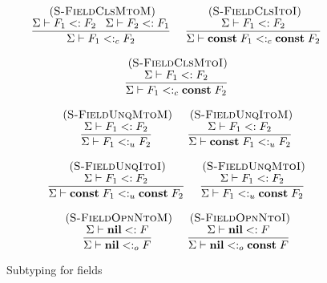 \documentclass[preprint]{sigplanconf}
\newcommand{\Nil}{\mathbf{nil}}
\newcommand{\Const}{\mathbf{const}}
\newcommand{\mylabel}[1]{\; (\textsc{#1})}
\newcommand{\senv}{\Sigma}
\newcommand{\subtype}{<:}
\begin{document}
\begin{figure}[t]
\[
\begin{array}{c}
\begin{array}{c}
\mylabel{S-FieldClsMtoM}\\
\dfrac{\senv \vdash F_{1} \subtype F_{2} \;\;\;
	\senv \vdash F_{2} \subtype F_{1}}
{\senv \vdash F_{1} \subtype_{c} F_{2}}
\end{array}
\;
\begin{array}{c}
\mylabel{S-FieldClsItoI}\\
\dfrac{\senv \vdash F_{1} \subtype F_{2}}
{\senv \vdash \Const \; F_{1} \subtype_{c} \Const \; F_{2}}
\end{array}
\\ \\
\begin{array}{c}
\mylabel{S-FieldClsMtoI}\\
\dfrac{\senv \vdash F_{1} \subtype F_{2}}
{\senv \vdash F_{1} \subtype_{c} \Const \; F_{2}}
\end{array}\\\\
\begin{array}{c}
\mylabel{S-FieldUnqMtoM}\\
\dfrac{\senv \vdash F_{1} \subtype F_{2}}
{\senv \vdash F_{1} \subtype_{u} F_{2}}
\end{array}
\;
\begin{array}{c}
\mylabel{S-FieldUnqItoM}\\
\dfrac{\senv \vdash F_{1} \subtype F_{2}}
{\senv \vdash \Const \; F_{1} \subtype_{u} F_{2}}
\end{array}
\\ \\
\begin{array}{c}
\mylabel{S-FieldUnqItoI}\\
\dfrac{\senv \vdash F_{1} \subtype F_{2}}
{\senv \vdash \Const \; F_{1} \subtype_{u} \Const \; F_{2}}
\end{array}
\;
\begin{array}{c}
\mylabel{S-FieldUnqMtoI}\\
\dfrac{\senv \vdash F_{1} \subtype F_{2}}
{\senv \vdash F_{1} \subtype_{u} \Const \; F_{2}}
\end{array}
\\ \\
\begin{array}{c}
\mylabel{S-FieldOpnNtoM}\\
\dfrac{\senv \vdash \Nil \subtype F}
{\senv \vdash \Nil \subtype_{o} F}
\end{array}
\;
\begin{array}{c}
\mylabel{S-FieldOpnNtoI}\\
\dfrac{\senv \vdash \Nil \subtype F}
{\senv \vdash \Nil \subtype_{o} \Const \; F}
\end{array}
\end{array}
\]
\caption{Subtyping for fields}
\label{fig:subfield}
\end{figure}
\end{document}
